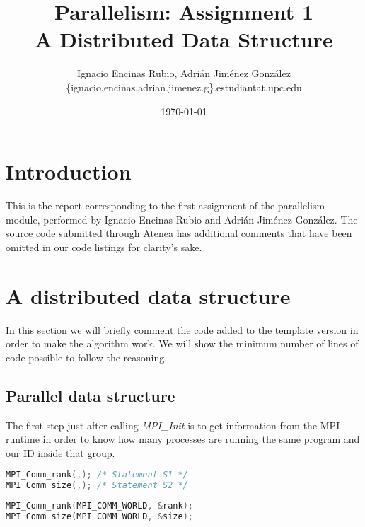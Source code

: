 \documentclass[a4paper, 10pt]{article}
\title{\textbf{Parallelism: Assignment 1\\A Distributed Data Structure}}
\author{Ignacio Encinas Rubio, Adrián Jiménez González\\\{ignacio.encinas,adrian.jimenez.g\}.estudiantat.upc.edu}
\date{\normalsize\today{}}
\begin{document}
\maketitle

  
  

\section{Introduction}

This is the report corresponding to the first assignment of the parallelism module, performed by Ignacio Encinas Rubio and Adrián Jiménez González. The source code submitted through Atenea has additional comments that have been omitted in our code listings for clarity's sake.


\section{A distributed data structure}

   In this section we will briefly comment the code added to the template version in order to
   make the algorithm work. We will show the minimum number of lines of code possible to follow the reasoning.

\subsection{Parallel data structure}


    The first step just after calling \textit{MPI\_Init} is to get information from the MPI runtime in order to know how many processes are running the same program and our ID inside that group. 

    \begin{minipage}{.45\textwidth}
	\begin{lstlisting}[language=c, caption={Template S1, S2}]
MPI_Comm_rank(,); /* Statement S1 */
MPI_Comm_size(,); /* Statement S2 */
	\end{lstlisting}
    \end{minipage}\hfill
    \begin{minipage}{.45\textwidth}
	\begin{lstlisting}[language=c, caption={Correct S1, S2}]
MPI_Comm_rank(MPI_COMM_WORLD, &rank); 
MPI_Comm_size(MPI_COMM_WORLD, &size); 
	\end{lstlisting}
    \end{minipage}
\end{document}
